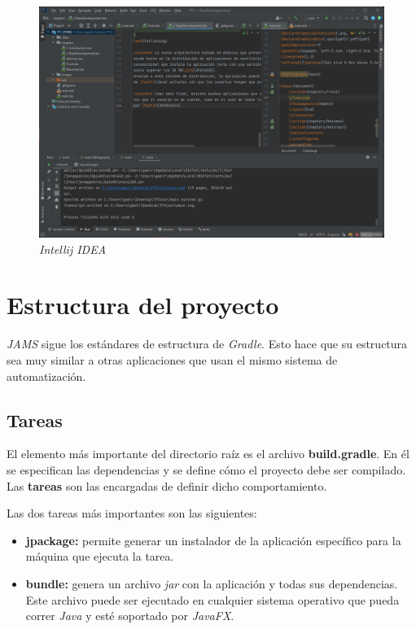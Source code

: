 \begin{figure}[H]
    \centering
    \includegraphics[width=\textwidth]{images/base/intellij-idea}
    \caption{\textit{Intellij IDEA}}
    \label{fig:java-intellij-idea}
\end{figure}


\section{Estructura del proyecto}\label{sec:estructura-del-proyecto}

\textit{JAMS} sigue los estándares de estructura de \textit{Gradle}\cite{GRADLE_ORGANIZING}.
Esto hace que su estructura sea muy similar a otras aplicaciones que usan el mismo
sistema de automatización.

\subsection{Tareas}\label{subsec:tareas}

\noindent El elemento más importante del directorio raíz es el archivo \textbf{build.gradle}.
En él se especifican las dependencias y se define cómo el proyecto debe ser compilado.
Las \textbf{tareas} son las encargadas de definir dicho comportamiento.

\noindent Las dos tareas más importantes son las siguientes:
\begin{itemize}
    \item \textbf{jpackage:} permite generar un instalador de la aplicación específico
    para la máquina que ejecuta la tarea.
    \item \textbf{bundle:} genera un archivo \textit{jar} con la aplicación y todas
    sus dependencias.
    Este archivo puede ser ejecutado en cualquier sistema operativo que pueda correr
    \textit{Java} y esté soportado por \textit{JavaFX}.
\end{itemize}

